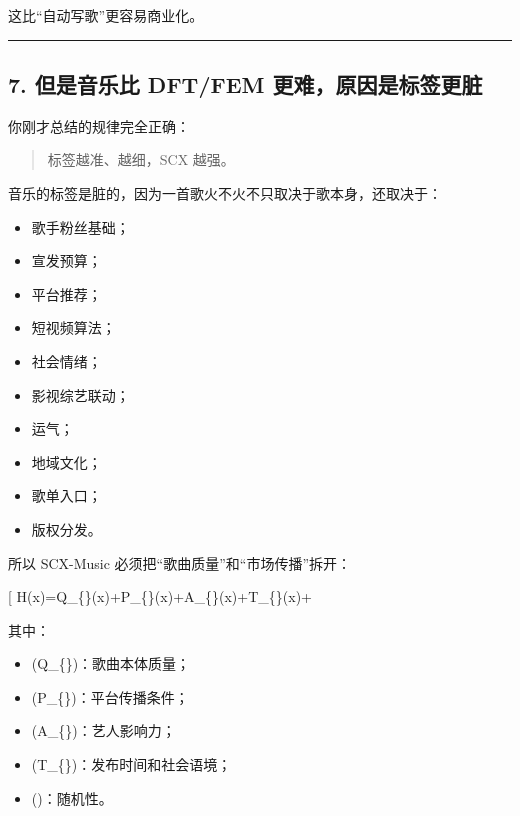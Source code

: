 \documentclass[
  12pt,
]{ctexart}
\providecommand{\tightlist}{%
  \setlength{\itemsep}{0pt}\setlength{\parskip}{0pt}}
\begin{document}
这比``自动写歌''更容易商业化。

\begin{center}\rule{0.5\linewidth}{0.5pt}\end{center}

\subsection{7. 但是音乐比 DFT/FEM
更难，原因是标签更脏}\label{ux4f46ux662fux97f3ux4e50ux6bd4-dftfem-ux66f4ux96beux539fux56e0ux662fux6807ux7b7eux66f4ux810f}

你刚才总结的规律完全正确：

\begin{quote}
标签越准、越细，SCX 越强。
\end{quote}

音乐的标签是脏的，因为一首歌火不火不只取决于歌本身，还取决于：

\begin{itemize}
\tightlist
\item
  歌手粉丝基础；
\item
  宣发预算；
\item
  平台推荐；
\item
  短视频算法；
\item
  社会情绪；
\item
  影视综艺联动；
\item
  运气；
\item
  地域文化；
\item
  歌单入口；
\item
  版权分发。
\end{itemize}

所以 SCX-Music 必须把``歌曲质量''和``市场传播''拆开：

{[}
H(x)=Q\_\{\}(x)+P\_\{\}(x)+A\_\{\}(x)+T\_\{\}(x)+\epsilon{]}

其中：

\begin{itemize}
\tightlist
\item
  (Q\_\{\})：歌曲本体质量；
\item
  (P\_\{\})：平台传播条件；
\item
  (A\_\{\})：艺人影响力；
\item
  (T\_\{\})：发布时间和社会语境；
\item
  (\epsilon)：随机性。
\end{itemize}
\end{document}
